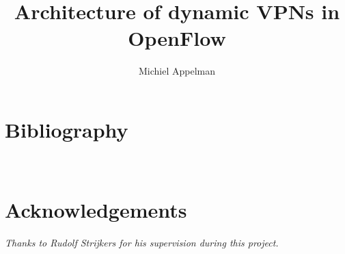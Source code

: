 \documentclass[oneside,8pt,a4paper]{article}
\title{Architecture of dynamic VPNs in OpenFlow}
\author{Michiel Appelman}
\begin{document}
	
	
	
	\clearpage

	\acresetall
	\setlength{\parskip}{0ex plus 0.5ex minus 0.2ex}
	
	\tableofcontents
	\clearpage

	\listoffigures
	\listoftables
	\clearpage
	
	\acresetall
		\setlength{\parskip}{1.3ex plus 0.2ex minus 0.2ex}
		\pagestyle{fancy}
		\renewcommand{\sectionmark}[1]{%
		\markboth{#1}{}}
		\fancyhead[L]{\small{\nouppercase{\leftmark}}}
		\fancyhead[R]{\nouppercase{\emph{\chaptername\ \LARGE{\thesection}}}}
		\renewcommand{\headrulewidth}{0.5pt}
		

		
		\clearpage
		
				
		\clearpage
		
						
		\clearpage
		
						
		\clearpage
		
						
		\clearpage
		
		\appendix
		\noappendicestocpagenum
		\addappheadtotoc
		\pagestyle{fancy}
		\renewcommand{\sectionmark}[1]{%
		\markboth{#1}{}}
		\fancyhead[L]{\small{\nouppercase{\leftmark}}}
		\fancyhead[R]{\nouppercase{\emph{\appendixname\ \LARGE{\thesection}}}}
		\renewcommand{\headrulewidth}{0.5pt}

		
		\clearpage

		\renewcommand*{\refname}{} %
		\section{Bibliography}
		
		

		\clearpage
		\pagestyle{empty}
		\hfill \\[6cm]
		\section*{Acknowledgements}
		\textsl{Thanks to Rudolf Strijkers for his supervision during this project.}
\end{document}
